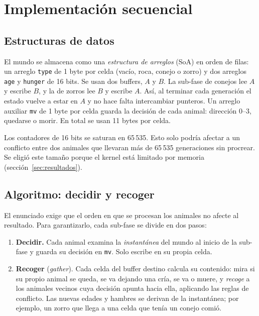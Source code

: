 \documentclass[11pt,a4paper]{article}
\begin{document}
\section{Implementación secuencial}
\subsection{Estructuras de datos}
El mundo se almacena como una \emph{estructura de arreglos} (SoA) en orden de filas: un arreglo
\texttt{type} de 1 byte por celda (vacío, roca, conejo o zorro) y dos arreglos \texttt{age} y
\texttt{hunger} de 16 bits. Se usan dos buffers, $A$ y $B$. La sub-fase de conejos lee $A$ y escribe $B$, y
la de zorros lee $B$ y escribe $A$. Así, al terminar cada generación el estado vuelve a estar en $A$ y no
hace falta intercambiar punteros. Un arreglo auxiliar \texttt{mv} de 1 byte por celda guarda la decisión de
cada animal: dirección 0--3, quedarse o morir. En total se usan 11 bytes por celda.

Los contadores de 16 bits se saturan en 65\,535. Esto solo podría afectar a un conflicto entre dos
animales que llevaran más de 65\,535 generaciones sin procrear. Se eligió este tamaño porque el kernel está
limitado por memoria (sección~\ref{sec:resultados}).

\subsection{Algoritmo: decidir y recoger}
El enunciado exige que el orden en que se procesan los animales no afecte al resultado. Para garantizarlo,
cada sub-fase se divide en dos pasos:

\begin{enumerate}[nosep]
  \item \textbf{Decidir.} Cada animal examina la \emph{instantánea} del mundo al inicio de la sub-fase y
    guarda su decisión en \texttt{mv}. Solo escribe en su propia celda.
  \item \textbf{Recoger} (\emph{gather}). Cada celda del buffer destino calcula su contenido: mira si su
    propio animal se queda, se va dejando una cría, se va o muere, y \emph{recoge} a los animales vecinos
    cuya decisión apunta hacia ella, aplicando las reglas de conflicto. Las nuevas edades y hambres se
    derivan de la instantánea; por ejemplo, un zorro que llega a una celda que tenía un conejo comió.
\end{enumerate}
\end{document}
